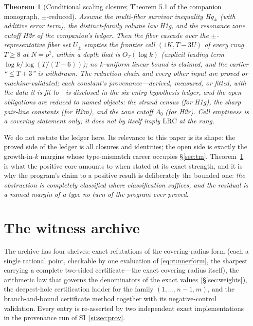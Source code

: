 \documentclass[11pt,a4paper]{article}
\numberwithin{equation}{section}
\theoremstyle{plain}
\newtheorem{theorem}{Theorem}[section]
\theoremstyle{definition}
\theoremstyle{remark}
\begin{document}
\begin{theorem}[Conditional scaling closure; Theorem 5.1 of the
companion monograph, $\pm$-reduced]\label{thm:SC}
Assume the multi-fiber survivor inequality Hq$_\pm$ (with additive error
term), the distinct-family volume law H1g, and the resonance zone cutoff
H2r of the companion's ledger. Then the fiber cascade over the
$\pm$-representative fiber set $U_\pm$ empties the frontier cell
$(1K,T{-}3U)$ of every rung $T\ge8$ at $N=p^2$, within a depth that is
$O_T(\log k)$ (explicit leading term $\log k/\log(T/(T-6))$); no
$k$-uniform linear bound is claimed, and the earlier ``$\le T+3$'' is
withdrawn. The reduction chain and every other input are proved or
machine-validated; each constant's provenance---derived, measured, or
fitted, with the data it is fit to---is disclosed in the six-entry
hypothesis ledger, and the open obligations are reduced to named objects:
the strand census (for H1g), the sharp pair-line constants (for H2m), and
the zone cutoff $\Lambda_0$ (for H2r). Cell emptiness is a covering
statement only; it does not by itself imply $\mathrm{LRC}$ at the rung.
\end{theorem}

We do not restate the ledger here. Its relevance to this paper is its
shape: the proved side of the ledger is all closures and identities; the
open side is exactly the growth-in-$k$ margins whose type-mismatch
career occupies \S\ref{sec:tm}. Theorem~\ref{thm:SC} is what the positive
core amounts to when stated at its exact strength, and it is why the
program's claim to a positive result is deliberately the bounded one:
\emph{the obstruction is completely classified where classification
suffices, and the residual is a named margin of a type no turn of the
program ever proved}.


\section{The witness archive}\label{sec:witness}

The archive has four shelves: exact refutations of the covering-radius
form (each a single rational point, checkable by one evaluation of
\eqref{eq:runnerform}, the sharpest carrying a complete two-sided
certificate---the exact covering radius itself), the arithmetic law
that governs the denominators of the
exact values (\S\ref{sec:weights}), the deepest-hole certification
ladder for the family $(1,\dots,n{-}1,m)$, and the branch-and-bound
certificate method together with its negative-control validation. Every
entry is re-asserted by two independent exact implementations in the
provenance run of SI~\ref{si:sec:prov}.
\end{document}
